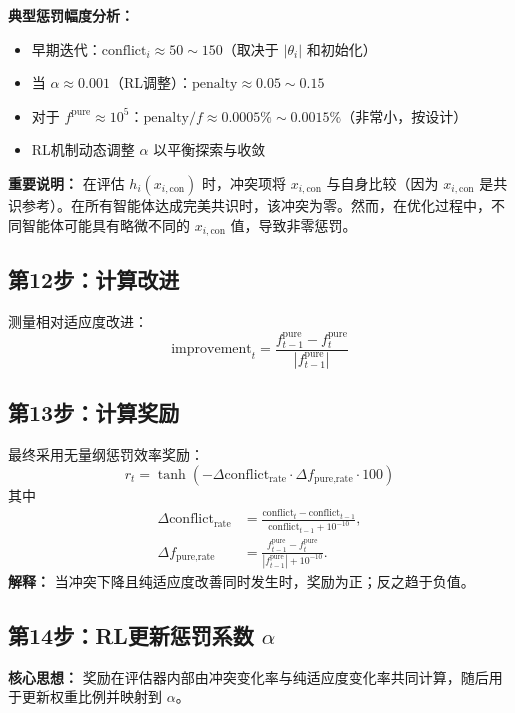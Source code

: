 \documentclass[11pt,a3paper]{ctexart}
\begin{document}
\textbf{典型惩罚幅度分析：}
\begin{itemize}
    \item 早期迭代：$\text{conflict}_i \approx 50 \sim 150$（取决于 $|\theta_i|$ 和初始化）
    \item 当 $\alpha \approx 0.001$（RL调整）：$\text{penalty} \approx 0.05 \sim 0.15$
    \item 对于 $f^{\text{pure}} \approx 10^5$：$\text{penalty}/f \approx 0.0005\% \sim 0.0015\%$（非常小，按设计）
    \item RL机制动态调整 $\alpha$ 以平衡探索与收敛
\end{itemize}

\textbf{重要说明：} 在评估 $h_i(x_{i,\text{con}})$ 时，冲突项将 $x_{i,\text{con}}$ 与自身比较（因为 $x_{i,\text{con}}$ 是共识参考）。在所有智能体达成完美共识时，该冲突为零。然而，在优化过程中，不同智能体可能具有略微不同的 $x_{i,\text{con}}$ 值，导致非零惩罚。
\subsection{第12步：计算改进}

测量相对适应度改进：
\begin{equation}
\text{improvement}_t = \frac{f_{t-1}^{\text{pure}} - f_t^{\text{pure}}}{|f_{t-1}^{\text{pure}}|}
\end{equation}

\subsection{第13步：计算奖励}

最终采用无量纲惩罚效率奖励：
\begin{equation}
r_t = \tanh\!\left(-\Delta\text{conflict}_{\text{rate}} \cdot \Delta f_{\text{pure,rate}} \cdot 100\right)
\end{equation}
其中
\begin{align}
\Delta\text{conflict}_{\text{rate}} &= \frac{\text{conflict}_t - \text{conflict}_{t-1}}{\text{conflict}_{t-1} + 10^{-10}}, \\
\Delta f_{\text{pure,rate}} &= \frac{f^{\text{pure}}_{t-1} - f^{\text{pure}}_t}{|f^{\text{pure}}_{t-1}| + 10^{-10}} .
\end{align}
\textbf{解释：} 当冲突下降且纯适应度改善同时发生时，奖励为正；反之趋于负值。
\subsection{第14步：RL更新惩罚系数 $\alpha$}
\textbf{核心思想：} 奖励在评估器内部由冲突变化率与纯适应度变化率共同计算，随后用于更新权重比例并映射到 $\alpha$。
\end{document}
